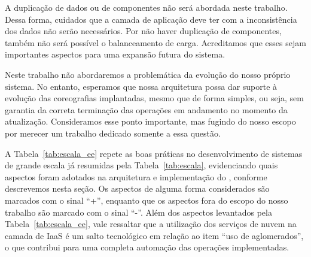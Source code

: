 A duplicação de dados ou de componentes não será abordada neste trabalho. Dessa forma, cuidados que a camada de aplicação deve ter com a inconsistência dos dados não serão necessários. Por não haver duplicação de componentes, também não será possível o balanceamento de carga. Acreditamos que esses sejam importantes aspectos para uma expansão futura do sistema.

Neste trabalho não abordaremos a problemática da evolução do nosso próprio sistema. No entanto, esperamos que nossa arquitetura possa dar suporte à evolução das coreografias implantadas, mesmo que de forma simples, ou seja, sem garantia da correta terminação das operações em andamento no momento da atualização. Consideramos esse ponto importante, mas fugindo do nosso escopo por merecer um trabalho dedicado somente a essa questão.

A Tabela~\ref{tab:escala_ee} repete as boas práticas no desenvolvimento de sistemas de grande escala já resumidas pela Tabela~\ref{tab:escala}, evidenciando quais aspectos foram adotados na arquitetura e implementação do \ee, conforme descrevemos nesta seção. Os aspectos de alguma forma considerados são marcados com o sinal ``+'', enquanto que os aspectos fora do escopo do nosso trabalho são marcado com o sinal ``-''. Além dos aspectos levantados pela Tabela~\ref{tab:escala_ee}, vale ressaltar que a utilização dos serviços de nuvem na camada de IaaS é um salto tecnológico em relação ao item ``uso de aglomerados'', o que contribui para uma completa automação das operações implementadas.

